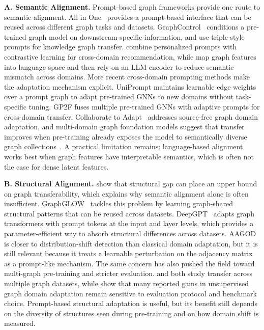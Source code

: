 \textbf{A. Semantic Alignment. }
Prompt-based graph frameworks provide one route to semantic alignment. All in One~\cite{sun2023all} provides a prompt-based interface that can be reused across different graph tasks and datasets. GraphControl~\cite{zhu2023graphcontrol} conditions a pre-trained graph model on downstream-specific information, and \citet{zhang2023structure} use triple-style prompts for knowledge graph transfer. \citet{yi2023contrastive} combine personalized prompts with contrastive learning for cross-domain recommendation, while \citet{liu2023one} map graph features into language space and then rely on an LLM encoder to reduce semantic mismatch across domains. More recent cross-domain prompting methods make the adaptation mechanism explicit. UniPrompt \cite{huang2025oneprompt} maintains learnable edge weights over a prompt graph to adapt pre-trained GNNs to new domains without task-specific tuning. GP2F \cite{he2026gp2f} fuses multiple pre-trained GNNs with adaptive prompts for cross-domain transfer. Collaborate to Adapt~\cite{zhang2024collaborate} addresses source-free graph domain adaptation, and multi-domain graph foundation models suggest that transfer improves when pre-training already exposes the model to semantically diverse graph collections~\cite{wang2025multidomain,yu2025samgpt}. A practical limitation remains: language-based alignment works best when graph features have interpretable semantics, which is often not the case for dense latent features.




\textbf{B. Structural Alignment.}
\citet{cao2023when} show that structural gap can place an upper bound on graph transferability, which explains why semantic alignment alone is often insufficient. GraphGLOW~\cite{zhao2023graphglow} tackles this problem by learning graph-shared structural patterns that can be reused across datasets. DeepGPT~\cite{shirkavand2023deep} adapts graph transformers with prompt tokens at the input and layer levels, which provides a parameter-efficient way to absorb structural differences across datasets. AAGOD~\cite{guo2023datacentric} is closer to distribution-shift detection than classical domain adaptation, but it is still relevant because it treats a learnable perturbation on the adjacency matrix as a prompt-like mechanism. The same concern has also pushed the field toward multi-graph pre-training and stricter evaluation. \citet{zhao2024all} and \citet{wang2025multidomain} both study transfer across multiple graph datasets, while \citet{liu2024revisiting} show that many reported gains in unsupervised graph domain adaptation remain sensitive to evaluation protocol and benchmark choice. Prompt-based structural adaptation is useful, but its benefit still depends on the diversity of structures seen during pre-training and on how domain shift is measured.
